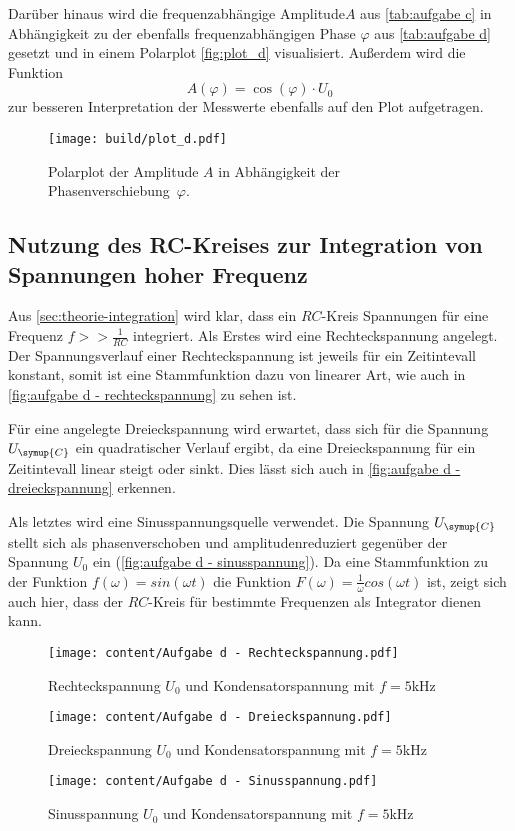 Darüber hinaus wird die frequenzabhängige Amplitude$A$ aus \autoref{tab:aufgabe c} in Abhängigkeit zu der
ebenfalls frequenzabhängigen Phase $\varphi$ aus \autoref{tab:aufgabe d} gesetzt und in einem Polarplot \autoref{fig:plot_d}
visualisiert. Außerdem wird die Funktion 
\begin{equation}
  A(\varphi) = \cos (\varphi) \cdot U_{0}
\end{equation}
zur besseren Interpretation der Messwerte ebenfalls auf den Plot aufgetragen.

\begin{figure}
  \centering
  \texttt{[image: build/plot\_d.pdf]}
  \caption{Polarplot der Amplitude $A$ in Abhängigkeit der Phasenverschiebung~$\varphi$.}
  \label{fig:plot_d}
\end{figure}

\subsection{Nutzung des RC-Kreises zur Integration von Spannungen hoher Frequenz}
Aus \autoref{sec:theorie-integration} wird klar, dass ein $RC$-Kreis Spannungen für eine Frequenz $f >> \frac{1}{RC}$
integriert. Als Erstes wird eine Rechteckspannung angelegt. Der Spannungsverlauf einer Rechteckspannung ist jeweils für ein
Zeitintevall konstant, somit ist eine Stammfunktion dazu von linearer Art, wie auch in \autoref{fig:aufgabe d - rechteckspannung}
zu sehen ist.

Für eine angelegte Dreieckspannung wird erwartet, dass sich für die Spannung $U_{\symup{C}}$ ein quadratischer Verlauf ergibt,
da eine Dreieckspannung für ein Zeitintevall linear steigt oder sinkt. Dies lässt sich auch in \autoref{fig:aufgabe d - dreieckspannung}
erkennen.

Als letztes wird eine Sinusspannungsquelle verwendet. Die Spannung $U_{\symup{C}}$ stellt sich als phasenverschoben
und amplitudenreduziert gegenüber der Spannung $U_{0}$ ein (\autoref{fig:aufgabe d - sinusspannung}). Da eine
Stammfunktion zu der Funktion $f(\omega)=sin(\omega t)$ die Funktion $F(\omega) = \frac{1}{\omega}cos(\omega t)$ ist,
zeigt sich auch hier, dass der $RC$-Kreis für bestimmte Frequenzen als Integrator dienen kann.

\begin{figure}
  \centering
  \texttt{[image: content/Aufgabe d - Rechteckspannung.pdf]}
  \caption{Rechteckspannung $U_{0}$ und Kondensatorspannung mit $f=5$kHz}
  \label{fig:aufgabe d - rechteckspannung}
\end{figure}

\begin{figure}
  \centering
  \texttt{[image: content/Aufgabe d - Dreieckspannung.pdf]}
  \caption{Dreieckspannung $U_{0}$ und Kondensatorspannung mit $f=5$kHz}
  \label{fig:aufgabe d - dreieckspannung}
\end{figure}

\begin{figure}
  \centering
  \texttt{[image: content/Aufgabe d - Sinusspannung.pdf]}
  \caption{Sinusspannung $U_{0}$ und Kondensatorspannung mit $f=5$kHz}
  \label{fig:aufgabe d - sinusspannung}
\end{figure}

